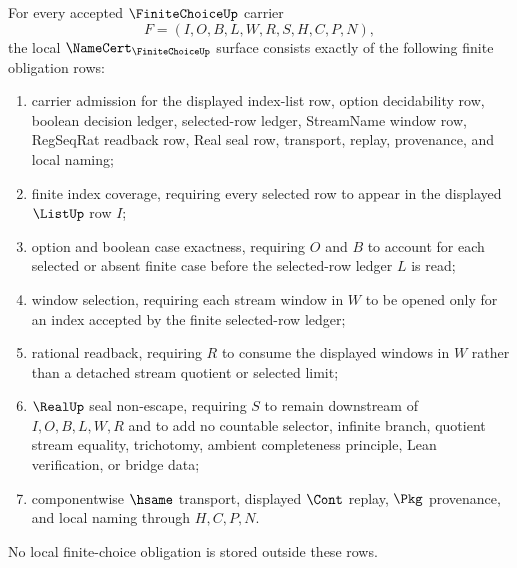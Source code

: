 \begin{theorem}
\label{thm:finite-choice-namecert-obligations}
For every accepted $\FiniteChoiceUp$ carrier
$$
F=(I,O,B,L,W,R,S,H,C,P,N),
$$
the local $\NameCert_{\FiniteChoiceUp}$ surface consists exactly of the following finite obligation rows:
\begin{enumerate}
\item carrier admission for the displayed index-list row, option decidability row, boolean decision ledger, selected-row ledger, StreamName window row, RegSeqRat readback row, Real seal row, transport, replay, provenance, and local naming;
\item finite index coverage, requiring every selected row to appear in the displayed $\ListUp$ row $I$;
\item option and boolean case exactness, requiring $O$ and $B$ to account for each selected or absent finite case before the selected-row ledger $L$ is read;
\item window selection, requiring each stream window in $W$ to be opened only for an index accepted by the finite selected-row ledger;
\item rational readback, requiring $R$ to consume the displayed windows in $W$ rather than a detached stream quotient or selected limit;
\item $\RealUp$ seal non-escape, requiring $S$ to remain downstream of $I,O,B,L,W,R$ and to add no countable selector, infinite branch, quotient stream equality, trichotomy, ambient completeness principle, Lean verification, or bridge data;
\item componentwise $\hsame$ transport, displayed $\Cont$ replay, $\Pkg$ provenance, and local naming through $H,C,P,N$.
\end{enumerate}
No local finite-choice obligation is stored outside these rows.
\end{theorem}
